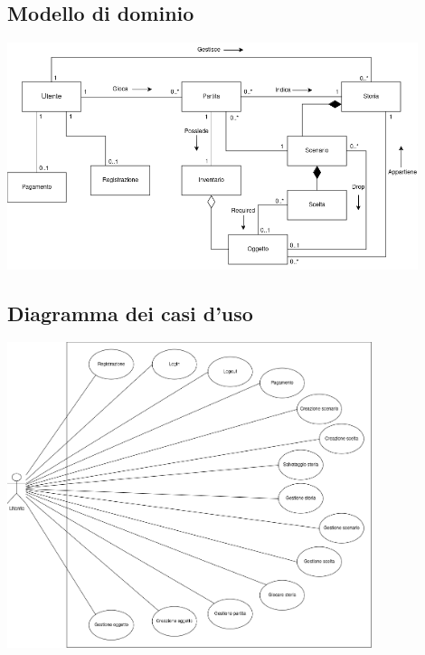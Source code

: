 \documentclass{article}
\begin{document}
\subsection*{Modello di dominio} 
\begin{center}
    \includegraphics[width=0.9\textwidth]{foto1.png}
\end{center}

\subsection*{Diagramma dei casi d'uso}
\begin{center}
    \includegraphics[width=0.8\textwidth]{foto2.png}
\end{center}
\end{document}
